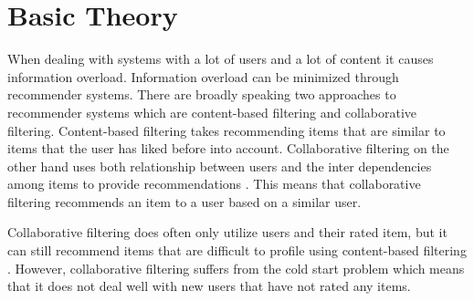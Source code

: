 \section{Basic Theory}
When dealing with systems with a lot of users and a lot of content it causes information overload.
Information overload can be minimized through recommender systems.
There are broadly speaking two approaches to recommender systems which are content-based filtering and collaborative filtering.
Content-based filtering takes recommending items that are similar to items that the user has liked before into account.
Collaborative filtering on the other hand uses both relationship between users and the inter dependencies among items to provide recommendations \cite{Matrix-factorization-techniques}.
This means that collaborative filtering recommends an item to a user based on a similar user.

Collaborative filtering does often only utilize users and their rated item, but it can still recommend items that are difficult to profile using content-based filtering \cite{Matrix-factorization-techniques}.
However, collaborative filtering suffers from the cold start problem which means that it does not deal well with new users that have not rated any items.

